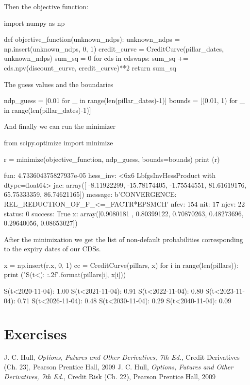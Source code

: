 Then the objective function:
\begin{ipython}
import numpy as np

def objective_function(unknown_ndps):
    unknown_ndps = np.insert(unknown_ndps, 0, 1)
    credit_curve = CreditCurve(pillar_dates, unknown_ndps)
    sum_sq = 0
    for cds in cdswaps:
        sum_sq += cds.npv(discount_curve, credit_curve)**2
    return sum_sq
\end{ipython}

The guess values and the boundaries
\begin{ipython}
ndp_guess = [0.01 for _ in range(len(pillar_dates)-1)]
bounds = [(0.01, 1) for _ in range(len(pillar_dates)-1)]
\end{ipython}

And finally we can run the minimizer
\begin{ipython}
from scipy.optimize import minimize

r = minimize(objective_function, ndp_guess, bounds=bounds)
print (r)
\end{ipython}
\begin{ioutput}
     fun: 4.733604375827937e-05
hess_inv: <6x6 LbfgsInvHessProduct with dtype=float64>
     jac: array([ -8.11922299, -15.78174405,  -1.75544551,  
                  81.61619176,  65.75333359,  86.74621165])
 message: b'CONVERGENCE: REL_REDUCTION_OF_F_<=_FACTR*EPSMCH'
    nfev: 154
     nit: 17
    njev: 22
  status: 0
 success: True
       x: array([0.9080181 , 0.80399122, 0.70870263, 
                 0.48273696, 0.29640056, 0.08653027])
\end{ioutput}

After the minimization we get the list of non-default probabilities corresponding to the expiry dates of our CDSs.

\begin{ipython}
x = np.insert(r.x, 0, 1)
cc = CreditCurve(pillars, x)
for i in range(len(pillars)):
    print ("S(t<{}): {:.2f}".format(pillars[i], x[i]))
\end{ipython}
\begin{ioutput}
S(t<2020-11-04): 1.00
S(t<2021-11-04): 0.91
S(t<2022-11-04): 0.80
S(t<2023-11-04): 0.71
S(t<2026-11-04): 0.48
S(t<2030-11-04): 0.29
S(t<2040-11-04): 0.09
\end{ioutput}

\section*{Exercises}


\begin{thebibliography}{9}
 J. C. Hull, \emph{Options, Futures and Other Derivatives, 7th Ed.}, Credit Derivatives (Ch. 23), Pearson Prentice Hall, 2009
 J. C. Hull, \emph{Options, Futures and Other Derivatives, 7th Ed.}, Credit Risk (Ch. 22), Pearson Prentice Hall, 2009
\end{thebibliography}
